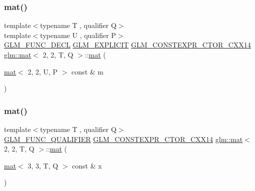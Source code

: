 \mbox{\label{structglm_1_1mat_3_012_00_012_00_01_t_00_01_q_01_4_a5957fcd6239f1897d7538031ce3b2f0d}} 
\subsubsection{\texorpdfstring{mat()}{mat()}\hspace{0.1cm}{\footnotesize\ttfamily [9/21]}}
{\footnotesize\ttfamily template$<$typename T , qualifier Q$>$ \\
template$<$typename U , qualifier P$>$ \\
\hyperlink{setup_8hpp_ab2d052de21a70539923e9bcbf6e83a51}{G\+L\+M\+\_\+\+F\+U\+N\+C\+\_\+\+D\+E\+CL} \hyperlink{setup_8hpp_a6c74f5a5e7b134ab69023ff9a30d4d5d}{G\+L\+M\+\_\+\+E\+X\+P\+L\+I\+C\+IT} \hyperlink{setup_8hpp_a0900f9145e68bf6061b6f5e7be3fa751}{G\+L\+M\+\_\+\+C\+O\+N\+S\+T\+E\+X\+P\+R\+\_\+\+C\+T\+O\+R\+\_\+\+C\+X\+X14} \hyperlink{structglm_1_1mat}{glm\+::mat}$<$ 2, 2, T, Q $>$\+::\hyperlink{structglm_1_1mat}{mat} (\begin{DoxyParamCaption}\item[{\hyperlink{structglm_1_1mat}{mat}$<$ 2, 2, U, P $>$ const \&}]{m }\end{DoxyParamCaption})}

\mbox{\label{structglm_1_1mat_3_012_00_012_00_01_t_00_01_q_01_4_a682cca2c732533360d904d912f4c69e8}} 
\subsubsection{\texorpdfstring{mat()}{mat()}\hspace{0.1cm}{\footnotesize\ttfamily [10/21]}}
{\footnotesize\ttfamily template$<$typename T , qualifier Q$>$ \\
\hyperlink{setup_8hpp_a33fdea6f91c5f834105f7415e2a64407}{G\+L\+M\+\_\+\+F\+U\+N\+C\+\_\+\+Q\+U\+A\+L\+I\+F\+I\+ER} \hyperlink{setup_8hpp_a0900f9145e68bf6061b6f5e7be3fa751}{G\+L\+M\+\_\+\+C\+O\+N\+S\+T\+E\+X\+P\+R\+\_\+\+C\+T\+O\+R\+\_\+\+C\+X\+X14} \hyperlink{structglm_1_1mat}{glm\+::mat}$<$ 2, 2, T, Q $>$\+::\hyperlink{structglm_1_1mat}{mat} (\begin{DoxyParamCaption}\item[{\hyperlink{structglm_1_1mat}{mat}$<$ 3, 3, T, Q $>$ const \&}]{x }\end{DoxyParamCaption})}

